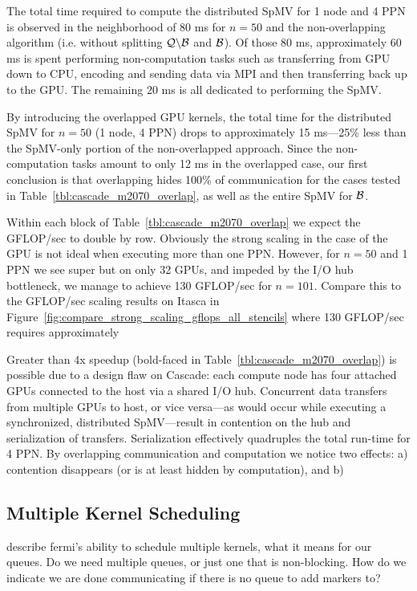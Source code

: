 \documentclass{report}
\begin{document}
The total time required to compute the distributed SpMV for 1 node and 4 PPN is observed in the neighborhood of 80 ms for $n=50$ and the non-overlapping algorithm (i.e. without splitting $\mathcal{Q} \backslash \mathcal{B}$ and $\mathcal{B}$). Of those 80 ms, approximately 60 ms is spent performing non-computation tasks such as transferring from GPU down to CPU, encoding and sending data via MPI and then transferring back up to the GPU. The remaining 20 ms is all dedicated to performing the SpMV.

By introducing the overlapped GPU kernels, the total time for the distributed SpMV for $n=50$ (1 node, 4 PPN) drops to approximately 15 ms---25\% less than the SpMV-only portion of the non-overlapped approach. Since the non-computation tasks amount to only 12 ms in the overlapped case, our first conclusion is that overlapping hides 100\% of communication for the cases tested in Table~\ref{tbl:cascade_m2070_overlap}, as well as the entire SpMV for $\mathcal{B}$. 

Within each block of Table~\ref{tbl:cascade_m2070_overlap} we expect the GFLOP/sec to double by row. Obviously the strong scaling in the case of the GPU is not ideal when executing more than one PPN. However, for $n=50$ and 1 PPN we see super but on only 32 GPUs, and impeded by the I/O hub bottleneck, we manage to achieve 130 GFLOP/sec for $n=101$. Compare this to the GFLOP/sec scaling results on Itasca in Figure~\ref{fig:compare_strong_scaling_gflops_all_stencils} where 130 GFLOP/sec requires approximately 


Greater than 4x speedup (bold-faced in Table~\ref{tbl:cascade_m2070_overlap}) is possible due to a design flaw on Cascade: each compute node has four attached GPUs connected to the host via a shared I/O hub. Concurrent data transfers from multiple GPUs to host, or vice versa---as would occur while executing a synchronized, distributed SpMV---result in contention on the hub and serialization of transfers. Serialization effectively quadruples the total run-time for 4 PPN. By overlapping communication and computation we notice two effects: a) contention disappears (or is at least hidden by computation), and b) 


\subsection{Multiple Kernel Scheduling}
describe fermi's ability to schedule multiple kernels, what it means for our queues. Do we need multiple queues, or just one that is non-blocking. How do we indicate we are done communicating if there is no queue to add markers to? 
\end{document}
